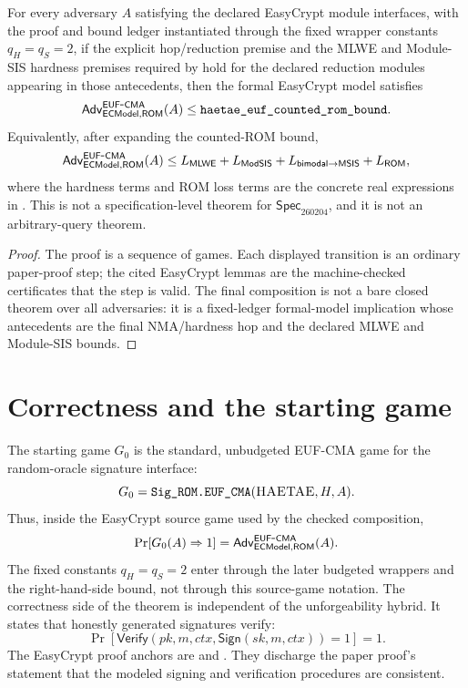 \begin{theorem}
\label{thm:reconstructed-haetae-euf}
For every adversary \(A\) satisfying the declared EasyCrypt module interfaces,
with the proof and bound ledger instantiated through the fixed wrapper constants
\(q_H=q_S=2\), if the explicit hop/reduction premise and the MLWE and
Module-SIS hardness premises required by
hold for the declared reduction modules appearing in those antecedents, then the
formal EasyCrypt model satisfies
\[
  \mathsf{Adv}_{\mathsf{ECModel},\mathsf{ROM}}^{\mathsf{EUF}\mbox{-}\mathsf{CMA}}(A)
  \le
  \texttt{haetae\_euf\_counted\_rom\_bound}.
\]
Equivalently, after expanding the counted-ROM bound,
\[
  \mathsf{Adv}_{\mathsf{ECModel},\mathsf{ROM}}^{\mathsf{EUF}\mbox{-}\mathsf{CMA}}(A)
  \le
  L_{\mathsf{MLWE}}
  +
  L_{\mathsf{ModSIS}}
  +
  L_{\mathsf{bimodal}\to\mathsf{MSIS}}
  +
  L_{\mathsf{ROM}},
\]
where the hardness terms and ROM loss terms are the concrete real expressions in
.  This is not a specification-level theorem for
\(\mathsf{Spec}_{260204}\), and it is not an arbitrary-query theorem.
\end{theorem}

\begin{proof}
The proof is a sequence of games.  Each displayed transition is an ordinary
paper-proof step; the cited EasyCrypt lemmas are the machine-checked
certificates that the step is valid.  The final composition is not a bare
closed theorem over all adversaries: it is a fixed-ledger formal-model
implication whose antecedents are the final NMA/hardness hop and the declared
MLWE and Module-SIS bounds.
\end{proof}

\section{Correctness and the starting game}
\label{sec:paper-proof-starting-game}

The starting game \(G_0\) is the standard, unbudgeted EUF-CMA game for the
random-oracle signature interface:
\[
  G_0 = \texttt{Sig\_ROM.EUF\_CMA}(\textsc{HAETAE},H,A).
\]
Thus, inside the EasyCrypt source game used by the checked composition,
\[
  \Pr[G_0(A)\Rightarrow 1]
  =
  \mathsf{Adv}_{\mathsf{ECModel},\mathsf{ROM}}^{\mathsf{EUF}\mbox{-}\mathsf{CMA}}(A).
\]
The fixed constants \(q_H=q_S=2\) enter through the later budgeted wrappers and
the right-hand-side bound, not through this source-game notation.
The correctness side of the theorem is independent of the unforgeability
hybrid.  It states that honestly generated signatures verify:
\[
  \Pr[
    \mathsf{Verify}(pk,m,ctx,\mathsf{Sign}(sk,m,ctx))=1
  ]=1.
\]
The EasyCrypt proof anchors are
 and
.  They discharge the paper proof's statement that the
modeled signing and verification procedures are consistent.

